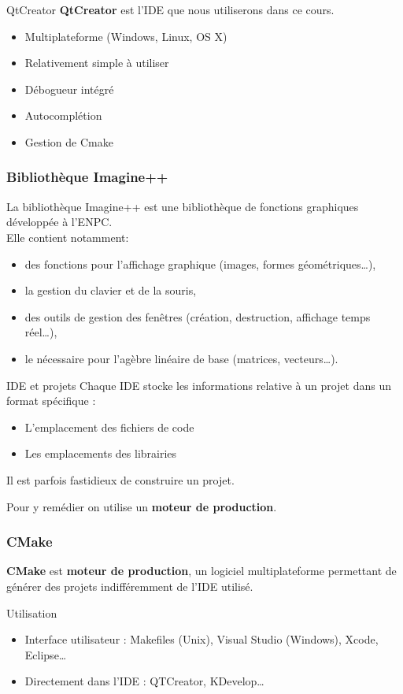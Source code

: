 \begin{frame}{QtCreator}
    \textbf{QtCreator} est l'IDE que nous utiliserons dans ce cours.
    \begin{itemize}
        \item Multiplateforme (Windows, Linux, OS X)
        \item Relativement simple à utiliser
        \item Débogueur intégré
        \item Autocomplétion
        \item Gestion de Cmake
    \end{itemize}
\end{frame}

\begin{frame}
  \frametitle{Bibliothèque Imagine++}
  La bibliothèque Imagine++ est une bibliothèque de fonctions graphiques développée à l'ENPC.\\
  Elle contient notamment:
  \begin{itemize}
      \item des fonctions pour l'affichage graphique (images, formes géométriques\dots),
      \item la gestion du clavier et de la souris,
      \item des outils de gestion des fenêtres (création, destruction, affichage temps réel\dots),
      \item le nécessaire pour l'agèbre linéaire de base (matrices, vecteurs\dots).
  \end{itemize}
\end{frame}

\begin{frame}{IDE et projets}
    Chaque IDE stocke les informations relative à un projet dans un format spécifique :
    \begin{itemize}
        \item L'emplacement des fichiers de code
        \item Les emplacements des librairies
    \end{itemize}
    Il est parfois fastidieux de construire un projet.

    Pour y remédier on utilise un \textbf{moteur de production}.

\end{frame}

\begin{frame}
  \frametitle{CMake}
  \textbf{CMake} est \textbf{moteur de production}, un logiciel multiplateforme permettant de générer des projets indifféremment de l'IDE utilisé.

  \begin{block}{Utilisation}
	  \begin{itemize}
		  \item Interface utilisateur : Makefiles (Unix), Visual Studio (Windows), Xcode, Eclipse\dots
		  \item Directement dans l'IDE : QTCreator, KDevelop\dots
	  \end{itemize}
  \end{block}
\end{frame}

